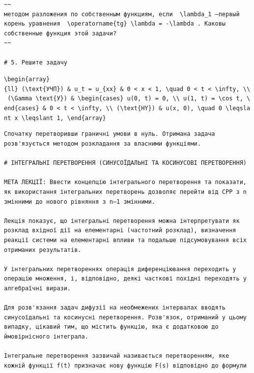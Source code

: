 \documentclass[
  ukrainian,
]{article}
\begin{document}
\begin{verbatim}
~~
методом разложения по собственным функциям, если  \lambda_1 —первый корень уравнения  \operatorname{tg} \lambda = -\lambda . Каковы собственные функция этой задачи?
~~

# 5. Решите задачу
\end{verbatim}

\texttt{\textbackslash{}begin\{array\}\{ll\}\ (\textbackslash{}text\{УЧП\})\ \&\ u\_t\ =\ u\_\{xx\}\ \&\ 0\ \textless{}\ x\ \textless{}\ 1,\ \textbackslash{}quad\ 0\ \textless{}\ t\ \textless{}\ \textbackslash{}infty,\ \textbackslash{}\textbackslash{}\ (\textbackslash{}Gamma\ \textbackslash{}text\{У\})\ \&\ \textbackslash{}begin\{cases\}\ u(0,\ t)\ =\ 0,\ \textbackslash{}\textbackslash{}\ u(1,\ t)\ =\ \textbackslash{}cos\ t,\ \textbackslash{}end\{cases\}\ \&\ 0\ \textless{}\ t\ \textless{}\ \textbackslash{}infty,\ \textbackslash{}\textbackslash{}\ (\textbackslash{}text\{HY\})\ \&\ u(x,\ 0),\ \textbackslash{}quad\ 0\ \textbackslash{}leqslant\ x\ \textbackslash{}leqslant\ 1,\ \textbackslash{}end\{array\}}

\begin{verbatim}
Спочатку перетворивши граничні умови в нуль. Отримана задача розв'язується методом розкладання за власними функціями.

# ІНТЕГРАЛЬНІ ПЕРЕТВОРЕННЯ (СИНУСОЇДАЛЬНІ ТА КОСИНУСОВІ ПЕРЕТВОРЕННЯ)

МЕТА ЛЕКЦІЇ: Ввести концепцію інтегрального перетворення та показати, як використання інтегральних перетворень дозволяє перейти від CPP з n змінними до нового рівняння з n—1 змінними.

Лекція показує, що інтегральні перетворення можна інтерпретувати як розклад вхідної дії на елементарні (частотний розклад), визначення реакції системи на елементарні впливи та подальше підсумовування всіх отриманих результатів.

У інтегральних перетвореннях операція диференціювання переходить у операцію множення, і, відповідно, деякі часткові похідні переходять у алгебраїчні вирази.

Для розв'язання задач дифузії на необмежених інтервалах вводять синусоїдальні та косинусні перетворення. Розв'язок, отриманий у цьому випадку, цікавий тим, що містить функцію, яка є додатковою до ймовірнісного інтеграла.

Інтегральне перетворення зазвичай називається перетворенням, яке кожній функції f(t) призначає нову функцію F(s) відповідно до формули
\end{verbatim}
\end{document}
